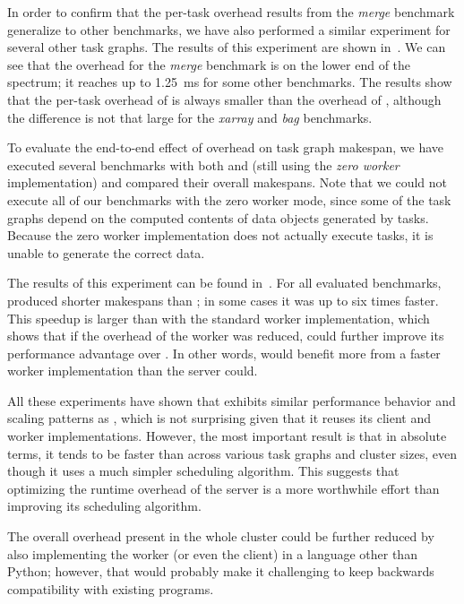 In order to confirm that the per-task overhead results from the \emph{merge}
benchmark generalize to other benchmarks, we have also performed a similar experiment for several
other task graphs. The results of this experiment are shown in~. We can
see that the overhead for the \emph{merge} benchmark is on the lower end of the
spectrum; it reaches up to \SI{1.25}{\milli\second} for some other benchmarks. The results show
that the per-task overhead of \rsds{} is always smaller than the overhead of
\dask{}, although the difference is not that large for the
\emph{xarray} and \emph{bag} benchmarks.

To evaluate the end-to-end effect of overhead on task graph makespan, we have executed several
benchmarks with both \dask{} and \rsds{} (still using the \emph{zero worker} implementation) and compared their
overall makespans. Note that we could not execute all of our benchmarks with the zero worker mode,
since some of the task graphs depend on the computed contents of data objects generated by tasks.
Because the zero worker implementation does not actually execute tasks, it is unable to generate
the correct data.

The results of this experiment can be found in~. For all evaluated
benchmarks, \rsds{} produced shorter makespans than
\dask{}; in some cases it was up to six times faster. This speedup is larger
than with the standard worker implementation, which shows that if the overhead of the worker was
reduced, \rsds{} could further improve its performance advantage over
\dask{}. In other words, \rsds{} would benefit more from a
faster worker implementation than the \dask{} server could.

All these experiments have shown that \rsds{} exhibits similar performance
behavior and scaling patterns as \dask{}, which is not surprising given that it
reuses its client and worker implementations. However, the most important result is that in
absolute terms, it tends to be faster than \dask{} across various task graphs
and cluster sizes, even though it uses a much simpler scheduling algorithm. This suggests that
optimizing the runtime overhead of the \dask{} server is a more worthwhile
effort than improving its scheduling algorithm.

The overall overhead present in the whole \rsds{} cluster could be further
reduced by also implementing the worker (or even the client) in a language other than Python;
however, that would probably make it challenging to keep backwards compatibility with existing
\dask{} programs.

